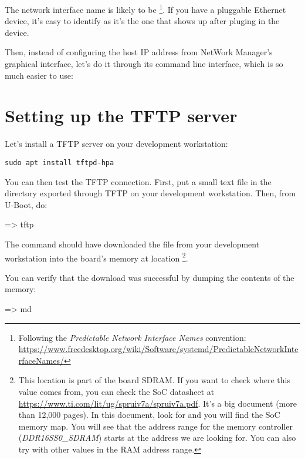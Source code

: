 The network interface name is likely to be
\footnote{Following the {\em Predictable Network Interface
Names} convention:
\url{https://www.freedesktop.org/wiki/Software/systemd/PredictableNetworkInterfaceNames/}}.
If you have a pluggable Ethernet device, it's easy to identify as it's
the one that shows up after pluging in the device.

Then, instead of configuring the host IP address from NetWork Manager's
graphical interface, let's do it through its command line interface,
which is so much easier to use:


\section{Setting up the TFTP server}

Let's install a TFTP server on your development workstation:

\begin{verbatim}
sudo apt install tftpd-hpa
\end{verbatim}

You can then test the TFTP connection. First, put a small text file in
the directory exported through TFTP on your development
workstation. Then, from U-Boot, do:

\begin{ubootinput}
=> tftp %
\end{ubootinput}

The  command should have downloaded the
 file from your development workstation into
the board's memory at location {\tt \zimageboardaddr}\footnote{
This location is part of the board SDRAM. If you want
to check where this value comes from, you can check the SoC
datasheet at
\url{https://www.ti.com/lit/ug/spruiv7a/spruiv7a.pdf}.
It's a big document (more than 12,000 pages). In this document, look
for  and you will find the SoC memory map.
You will see that the address range for the memory controller
({\em DDR16SS0\_SDRAM})
starts at the address we are looking for.
You can also try with other values in the RAM address range.}.

You can verify that the download was successful by dumping the
contents of the memory:

\begin{ubootinput}
=> md %
\end{ubootinput}

